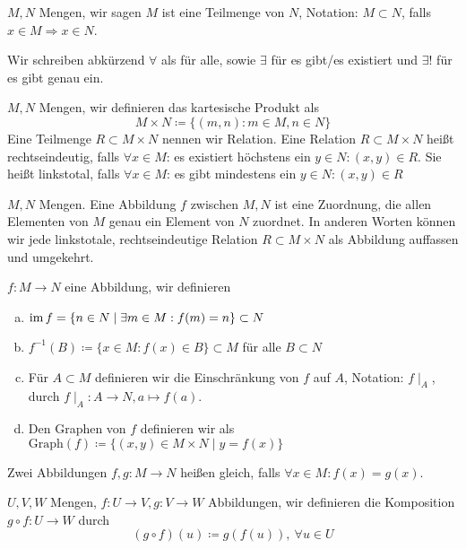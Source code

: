     \begin{defn}[Teilmengen] $M,N$ Mengen, wir sagen $M$ ist eine Teilmenge von $N$, Notation: $M\subset N$, falls $x\in M\Rightarrow x\in N$.
    \end{defn}
    \begin{defn}[Quantoren] Wir schreiben abkürzend $\forall$ als \glqq für alle\grqq{}, sowie $\exists$ für \glqq es gibt/es existiert\grqq{} und $\exists !$ für \glqq es gibt genau ein\grqq{}.
    \end{defn}
    \begin{defn}
        $M,N$ Mengen, wir definieren das kartesische Produkt als
        \[
        M \times N \coloneqq \{(m,n) : m\in M, n\in N\}    
        \]
    Eine Teilmenge $R\subset M\times N$ nennen wir Relation. Eine Relation $R\subset M\times N$ heißt rechtseindeutig, falls $\forall x\in M$: es existiert höchstens ein $y\in N:(x,y)\in R$.
    Sie heißt linkstotal, falls $\forall x\in M$: es gibt mindestens ein $y\in N:(x,y)\in R$
    \end{defn}
    \begin{defn}[Abbildungen]
        $M,N$ Mengen. Eine Abbildung $f$ zwischen $M,N$ ist eine Zuordnung, die allen Elementen von $M$ genau ein Element von $N$ zuordnet. 
        In anderen Worten können wir jede linkstotale, rechtseindeutige Relation $R\subset M\times N$ als Abbildung auffassen und umgekehrt.
    \end{defn}
    \begin{defn}
        $f:M\to N$ eine Abbildung, wir definieren 
        \begin{enumerate}[(a)]
            \item $\operatorname{im} f = \{ n\in N \mid \exists m\in M : f(m) =n\}\subset N$
            \item $f^{-1}(B) \coloneqq \{x\in M: f(x)\in B\}\subset M$ für alle $B\subset N$
            \item Für $A\subset M$ definieren wir die Einschränkung von $f$ auf $A$, Notation: $f\mid_A$, durch $f\mid_A:A\to N, a\mapsto f(a)$. 
            \item Den Graphen von $f$ definieren wir als $\text{Graph}(f)\coloneqq \{(x,y)\in M\times N\mid y=f(x)\}$
        \end{enumerate}
        Zwei Abbildungen $f,g:M\to N$ heißen gleich, falls $\forall x\in M:f(x)=g(x)$.
    \end{defn}
    \begin{defn}[Komposition]
        $U,V,W$ Mengen, $f:U\to V, g:V\to W$ Abbildungen, wir definieren die Komposition $g\circ f:U\to W$ durch 
        \[
        (g\circ f)(u)\coloneqq  g(f(u)), \ \forall u \in U    
        \]
    \end{defn}
